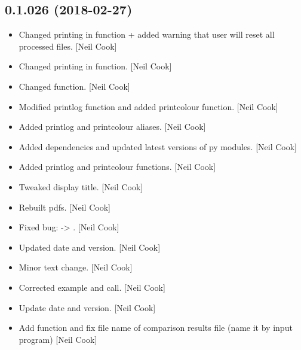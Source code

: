 \documentclass[a4paper,10pt,english]{report}
\begin{document}
\subsection{0.1.026 (2018-02-27)}
\label{\detokenize{misc/changelog:id477}}\begin{itemize}
\item {} 
Changed printing in function + added warning that user will reset all
processed files. {[}Neil Cook{]}

\item {} 
Changed printing in function. {[}Neil Cook{]}

\item {} 
Changed  function. {[}Neil Cook{]}

\item {} 
Modified printlog function and added printcolour function. {[}Neil Cook{]}

\item {} 
Added printlog and printcolour aliases. {[}Neil Cook{]}

\item {} 
Added dependencies and updated latest versions of py modules. {[}Neil
Cook{]}

\item {} 
Added printlog and printcolour functions. {[}Neil Cook{]}

\item {} 
Tweaked display title. {[}Neil Cook{]}

\item {} 
Rebuilt pdfs. {[}Neil Cook{]}

\item {} 
Fixed bug:  -\textgreater{} . {[}Neil Cook{]}

\item {} 
Updated date and version. {[}Neil Cook{]}

\item {} 
Minor text change. {[}Neil Cook{]}

\item {} 
Corrected  example and call. {[}Neil Cook{]}

\item {} 
Update date and version. {[}Neil Cook{]}

\item {} 
Add  function and fix file name of comparison results
file (name it by input program) {[}Neil Cook{]}


\end{itemize}
\end{document}
